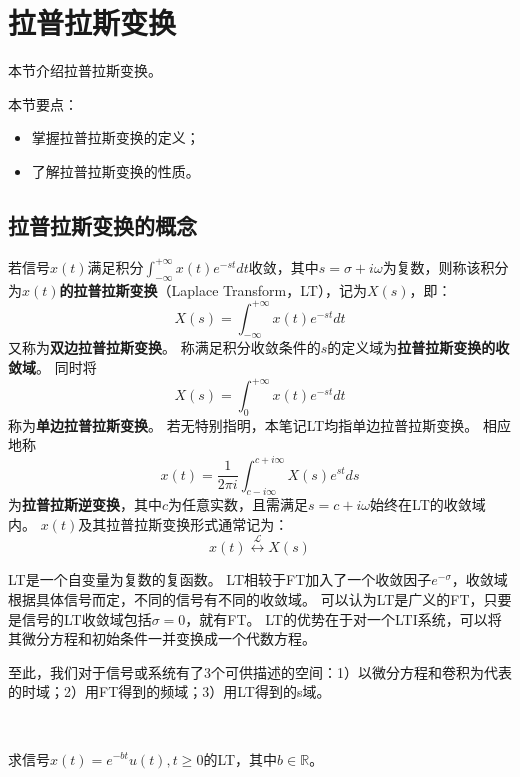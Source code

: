 \section{拉普拉斯变换}

本节介绍拉普拉斯变换。

本节要点：
\begin{itemize}
    \item 掌握拉普拉斯变换的定义；
    \item 了解拉普拉斯变换的性质。
\end{itemize}

\subsection{拉普拉斯变换的概念}

\begin{definition}[拉普拉斯变换]
若信号$x\left( t \right) $满足积分$\int_{-\infty}^{+\infty}{x\left( t \right) e^{-st}dt}$收敛，其中$s=\sigma +i\omega $为复数，则称该积分为{\bf $x\left( t \right) $的拉普拉斯变换}（Laplace Transform，LT），记为$X\left( s \right) $，即：
\[
X\left( s \right) =\int_{-\infty}^{+\infty}{x\left( t \right) e^{-st}dt}
\]
又称为{\bf 双边拉普拉斯变换}。
称满足积分收敛条件的$s$的定义域为{\bf 拉普拉斯变换的收敛域}。
同时将
\[
X\left( s \right) =\int_0^{+\infty}{x\left( t \right) e^{-st}dt}
\]
称为{\bf 单边拉普拉斯变换}。
若无特别指明，本笔记LT均指单边拉普拉斯变换。
相应地称
\[
x\left( t \right) =\frac{1}{2\pi i}\int_{c-i\infty}^{c+i\infty}{X\left( s \right) e^{st}ds}
\]
为{\bf 拉普拉斯逆变换}，其中$c$为任意实数，且需满足$s=c+i\omega $始终在LT的收敛域内。
$x\left( t \right) $及其拉普拉斯变换形式通常记为：
\[
x\left( t \right) \overset{\mathscr{L}}{\leftrightarrow}X\left( s \right)
\]
\end{definition}

LT是一个自变量为复数的复函数。
LT相较于FT加入了一个收敛因子$e^{-\sigma}$，收敛域根据具体信号而定，不同的信号有不同的收敛域。
可以认为LT是广义的FT，只要是信号的LT收敛域包括$\sigma =0$，就有FT。
LT的优势在于对一个LTI系统，可以将其微分方程和初始条件一并变换成一个代数方程。

至此，我们对于信号或系统有了3个可供描述的空间：1）以微分方程和卷积为代表的时域；2）用FT得到的频域；3）用LT得到的s域。

~

\begin{example}
求信号$x\left( t \right) =e^{-bt}u\left( t \right) ,t\geqslant 0$的LT，其中$b\in \mathbb{R} $。
\end{example}

